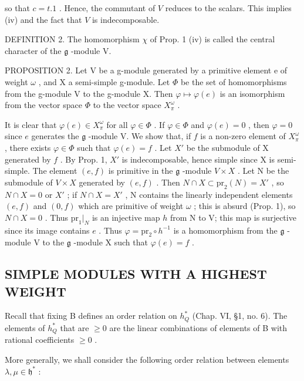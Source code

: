 so that \(c = t.1\) . Hence, the commutant of \(V\) reduces to the scalars. This implies (iv) and the fact that \(V\) is indecomposable.

DEFINITION 2. The homomorphism \(\chi\) of Prop. 1 (iv) is called the central character of the \(\mathfrak{g}\) -module V.

PROPOSITION 2. Let V be a g-module generated by a primitive element e of weight \(\omega\) , and X a semi-simple g-module. Let \(\Phi\) be the set of homomorphisms from the g-module V to the g-module X. Then \(\varphi\mapsto\varphi(e)\) is an isomorphism from the vector space \(\Phi\) to the vector space \(X_{\pi}^{\omega}\) .

It is clear that \(\varphi(e) \in X_{\pi}^{\omega}\) for all \(\varphi \in \Phi\) . If \(\varphi \in \Phi\) and \(\varphi(e) = 0\) , then \(\varphi = 0\) since \(e\) generates the \(\mathfrak{g}\) -module V. We show that, if \(f\) is a non-zero element of \(X_{\pi}^{\omega}\) , there exists \(\varphi \in \Phi\) such that \(\varphi(e) = f\) . Let \(X'\) be the submodule of X generated by \(f\) . By Prop. 1, \(X'\) is indecomposable, hence simple since X is semi-simple. The element \((e, f)\) is primitive in the \(\mathfrak{g}\) -module \(V \times X\) . Let N be the submodule of \(V \times X\) generated by \((e, f)\) . Then \(N \cap X \subset \mathrm{pr}_2(N) = X'\) , so \(N \cap X = 0\) or \(X'\) ; if \(N \cap X = X'\) , N contains the linearly independent elements \((e, f)\) and \((0, f)\) which are primitive of weight \(\omega\) ; this is absurd (Prop. 1), so \(N \cap X = 0\) . Thus \(\mathrm{pr}_1|_{N}\) is an injective map \(h\) from N to V; this map is surjective since its image contains \(e\) . Thus \(\varphi = \mathrm{pr}_2 \circ h^{-1}\) is a homomorphism from the \(\mathfrak{g}\) -module V to the \(\mathfrak{g}\) -module X such that \(\varphi(e) = f\) .

\subsection{SIMPLE MODULES WITH A HIGHEST WEIGHT}

Recall that fixing B defines an order relation on \(h_{Q}^{*}\) (Chap. VI, §1, no. 6). The elements of \(h_{Q}^{*}\) that are \(\geq 0\) are the linear combinations of elements of B with rational coefficients \(\geq 0\) .

More generally, we shall consider the following order relation between elements \(\lambda, \mu \in \mathfrak{h}^*\) :

